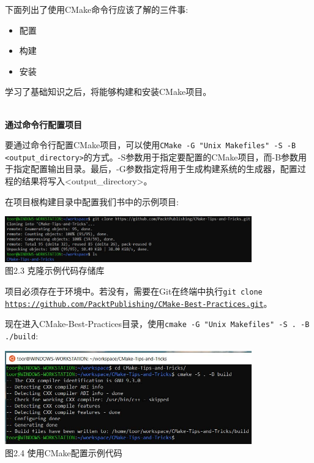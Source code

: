 下面列出了使用CMake命令行应该了解的三件事:

\begin{itemize}
\item 
配置

\item 
构建

\item 
安装
\end{itemize}

学习了基础知识之后，将能够构建和安装CMake项目。

\hspace*{\fill} \\ %
\noindent
\textbf{通过命令行配置项目}

要通过命令行配置CMake项目，可以使用\texttt{CMake -G "Unix Makefiles" -S  -B <output\_directory>}的方式。-S参数用于指定要配置的CMake项目，而-B参数用于指定配置输出目录。最后，-G参数指定将用于生成构建系统的生成器，配置过程的结果将写入<output\_directory>。

在项目根构建目录中配置我们书中的示例项目:

\begin{center}
\includegraphics[width=0.8\textwidth]{content/1/chapter2/images/3.jpg}\\
图2.3 克隆示例代码存储库
\end{center}

\begin{tcolorbox}[colback=webgreen!5!white,colframe=webgreen!75!black,title=重要Note]
项目必须存在于环境中。若没有，需要在Git在终端中执行\texttt{git clone \url{https://github.com/PacktPublishing/CMake-Best-Practices.git}}。
\end{tcolorbox}

现在进入CMake-Best-Practices目录，使用\texttt{cmake -G "Unix Makefiles" -S . -B ./build}:

\begin{center}
\includegraphics[width=0.8\textwidth]{content/1/chapter2/images/4.jpg}\\
图2.4 使用CMake配置示例代码
\end{center}

